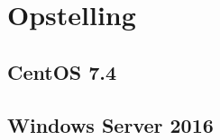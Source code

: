 
\chapter{Opstelling}
\label{ch:opstelling}


\section{CentOS 7.4}

\lipsum[21-25]

\section{Windows Server 2016}


\lipsum[21-25]

